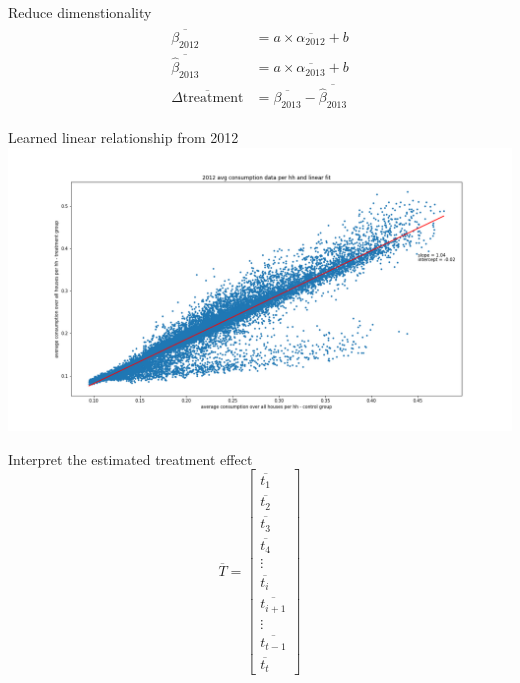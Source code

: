 \documentclass{beamer}
\begin{document}
\begin{frame}{Reduce dimenstionality}
  \begin{align*}
    \begin{split}
      \overline{\beta_{2012}} &= a \times \overline{\alpha_{2012}} + b \\
      \overline{\hat{\beta}_{2013}} &= a \times \overline{\alpha_{2013}} + b \\
      \overline{\Delta\mbox{treatment}} &= \overline{\beta_{2013}} - \overline{\hat{\beta}_{2013}}
    \end{split}
  \end{align*}
\end{frame}

\begin{frame}{Learned linear relationship from 2012}
  \centering
  \includegraphics[width=1\textwidth]{images/2012-avg.png}
\end{frame}

\begin{frame}{Interpret the estimated treatment effect}
    $$
    \overline{T} = \left[\begin{array}{cccc}
    \overline{t_{1}} \\
    \overline{t_{2}} \\
    \overline{t_{3}} \\
    \overline{t_{4}} \\
    \vdots \\
    \overline{t_{i}} \\
    \overline{t_{i+1}} \\
    \vdots \\
    \overline{t_{t-1}} \\
    \overline{t_{t}}
    \end{array}\right]
    $$
\end{frame}
\end{document}
